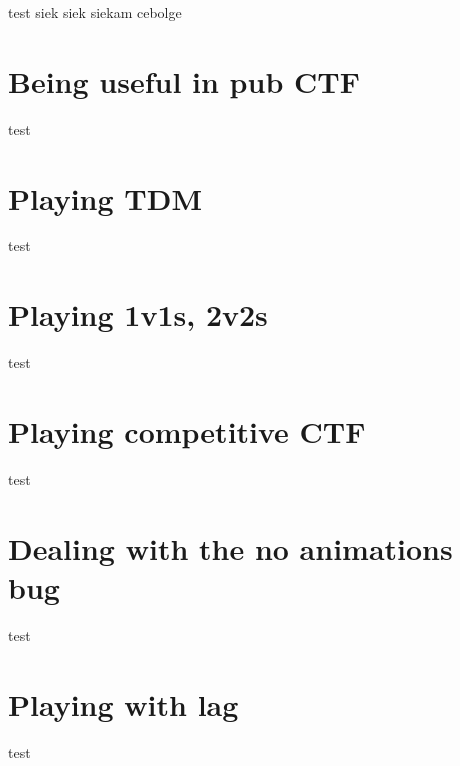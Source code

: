 \documentclass[]{book}
\begin{document}
test
siek siek siekam cebolge

\hypertarget{being-useful-in-pub-ctf}{%
\chapter{Being useful in pub CTF}\label{being-useful-in-pub-ctf}}

test

\hypertarget{playing-tdm}{%
\chapter{Playing TDM}\label{playing-tdm}}

test

\hypertarget{playing-1v1s-2v2s}{%
\chapter{Playing 1v1s, 2v2s}\label{playing-1v1s-2v2s}}

test

\hypertarget{playing-competitive-ctf}{%
\chapter{Playing competitive CTF}\label{playing-competitive-ctf}}

test

\hypertarget{dealing-with-the-no-animations-bug}{%
\chapter{Dealing with the no animations bug}\label{dealing-with-the-no-animations-bug}}

test

\hypertarget{playing-with-lag}{%
\chapter{Playing with lag}\label{playing-with-lag}}

test


\end{document}
